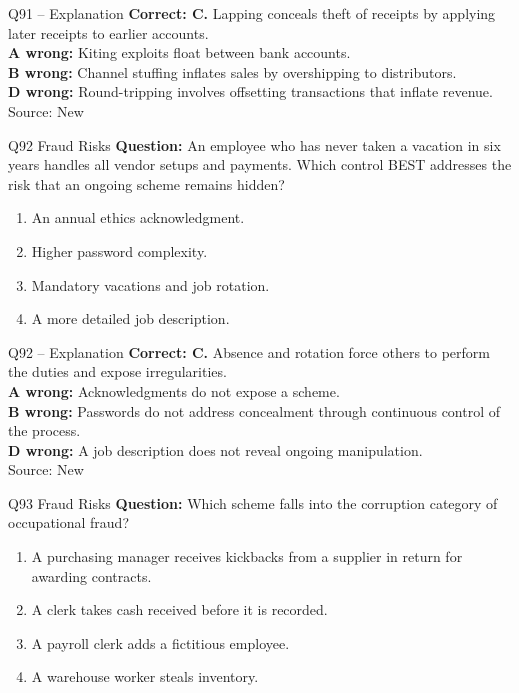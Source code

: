 \documentclass[aspectratio=169,10pt]{beamer}
\begin{document}
\begin{frame}[t]{Q91 -- Explanation}
	\footnotesize
	\textbf{Correct: C.} Lapping conceals theft of receipts by applying later receipts to earlier accounts. \\[5pt]
\textbf{A wrong:} Kiting exploits float between bank accounts. \\[3pt]
\textbf{B wrong:} Channel stuffing inflates sales by overshipping to distributors. \\[3pt]
\textbf{D wrong:} Round-tripping involves offsetting transactions that inflate revenue. \\[3pt]
	\vfill {\tiny Source: New}
\end{frame}

\begin{frame}[t]{Q92 \hfill {\scriptsize Fraud Risks}}
	\small
	\textbf{Question:} An employee who has never taken a vacation in six years handles all vendor setups and payments. Which control BEST addresses the risk that an ongoing scheme remains hidden?
	\begin{enumerate}[label=\Alph*.,itemsep=1pt,topsep=3pt]
			\item An annual ethics acknowledgment.
			\item Higher password complexity.
			\item Mandatory vacations and job rotation.
			\item A more detailed job description.
	\end{enumerate}
\end{frame}

\begin{frame}[t]{Q92 -- Explanation}
	\footnotesize
	\textbf{Correct: C.} Absence and rotation force others to perform the duties and expose irregularities. \\[5pt]
\textbf{A wrong:} Acknowledgments do not expose a scheme. \\[3pt]
\textbf{B wrong:} Passwords do not address concealment through continuous control of the process. \\[3pt]
\textbf{D wrong:} A job description does not reveal ongoing manipulation. \\[3pt]
	\vfill {\tiny Source: New}
\end{frame}

\begin{frame}[t]{Q93 \hfill {\scriptsize Fraud Risks}}
	\small
	\textbf{Question:} Which scheme falls into the corruption category of occupational fraud?
	\begin{enumerate}[label=\Alph*.,itemsep=1pt,topsep=3pt]
			\item A purchasing manager receives kickbacks from a supplier in return for awarding contracts.
			\item A clerk takes cash received before it is recorded.
			\item A payroll clerk adds a fictitious employee.
			\item A warehouse worker steals inventory.
	\end{enumerate}
\end{frame}
\end{document}
